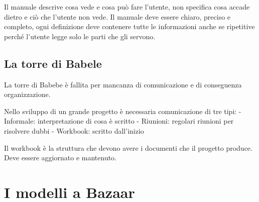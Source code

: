 \documentclass[a4paper,12pt,titlepage,oneside]{book}
\begin{document}
Il manuale descrive cosa vede e cosa può fare l'utente, non specifica cosa accade dietro e ciò che l'utente non vede. Il manuale deve essere chiaro, preciso e completo, ogni definizione deve contenere tutte le informazioni anche se ripetitive perché l'utente legge solo le parti che gli servono.

\subsection{La torre di Babele}
La torre di Babebe è fallita per mancanza di comunicazione e di conseguenza organizzazione.

Nello sviluppo di un grande progetto è necessaria comunicazione di tre tipi:
- Informale: interpretazione di cosa è scritto
- Riunioni: regolari riunioni per risolvere dubbi
- Workbook: scritto dall'inizio

Il workbook è la struttura che devono avere i documenti che il progetto produce. Deve essere aggiornato e mantenuto.

\section{I modelli a Bazaar}
\end{document}
